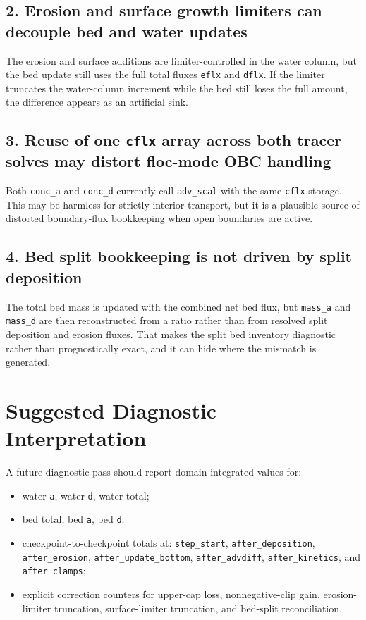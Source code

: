 \documentclass[11pt]{article}
\begin{document}
\subsection*{2. Erosion and surface growth limiters can decouple bed and water updates}
The erosion and surface additions are limiter-controlled in the water column, but the bed update
still uses the full total fluxes \texttt{eflx} and \texttt{dflx}. If the limiter truncates the
water-column increment while the bed still loses the full amount, the difference appears as an
artificial sink.

\subsection*{3. Reuse of one \texttt{cflx} array across both tracer solves may distort floc-mode OBC handling}
Both \texttt{conc\_a} and \texttt{conc\_d} currently call \texttt{adv\_scal} with the same
\texttt{cflx} storage. This may be harmless for strictly interior transport, but it is a plausible
source of distorted boundary-flux bookkeeping when open boundaries are active.

\subsection*{4. Bed split bookkeeping is not driven by split deposition}
The total bed mass is updated with the combined net bed flux, but \texttt{mass\_a} and
\texttt{mass\_d} are then reconstructed from a ratio rather than from resolved split deposition and
erosion fluxes. That makes the split bed inventory diagnostic rather than prognostically exact, and
it can hide where the mismatch is generated.

\section{Suggested Diagnostic Interpretation}
A future diagnostic pass should report domain-integrated values for:
\begin{itemize}
\item water \texttt{a}, water \texttt{d}, water total;
\item bed total, bed \texttt{a}, bed \texttt{d};
\item checkpoint-to-checkpoint totals at:
\texttt{step\_start}, \texttt{after\_deposition}, \texttt{after\_erosion},
\texttt{after\_update\_bottom}, \texttt{after\_advdiff}, \texttt{after\_kinetics}, and
\texttt{after\_clamps};
\item explicit correction counters for upper-cap loss, nonnegative-clip gain, erosion-limiter
truncation, surface-limiter truncation, and bed-split reconciliation.
\end{itemize}
\end{document}
